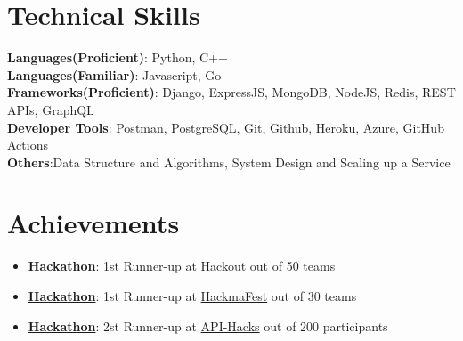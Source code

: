 \documentclass[letterpaper,11pt]{article}
\newcommand{\resumeItem}[1]{
  \item\small{
    {#1 \vspace{-2pt}}
  }
}
\newcommand{\resumeItemListStart}{\begin{itemize}}
\newcommand{\resumeItemListEnd}{\end{itemize}\vspace{-5pt}}
\begin{document}
%
\section{Technical Skills}
 \begin{itemize}[leftmargin=0.15in, label={}]
    \small{\item{
     \textbf{Languages(Proficient)}{: Python, C++} \\
      \textbf{Languages(Familiar)}{: Javascript, Go} \\
     \textbf{Frameworks(Proficient)}{: Django, ExpressJS, MongoDB, NodeJS, Redis, REST APIs, GraphQL} \\
     \textbf{Developer Tools}{: Postman, PostgreSQL, Git, Github, Heroku, Azure, GitHub Actions} \\
     \textbf{Others}{:Data Structure and Algorithms, System Design and Scaling up a Service}\\
    }}
 \end{itemize}

\section{Achievements}
 \begin{itemize}[leftmargin=0.15in, label={}]
    \small{\item{
        \resumeItemListStart
                \resumeItem{\textbf{\href{Link if any}{Hackathon}}: 1st Runner-up at \href{https://www.hackout.io/}{Hackout} out of 50 teams}
                \resumeItem{\textbf{\href{Link if any}{Hackathon}}: 1st Runner-up at \href{https://hackmafest.tech/}{HackmaFest} out of 30 teams}
                \resumeItem{\textbf{\href{Link if any}{Hackathon}}: 2st Runner-up at \href{https://apihacks.co/}{API-Hacks} out of 200 participants}
      \resumeItemListEnd
    }}
 \end{itemize}
\end{document}

